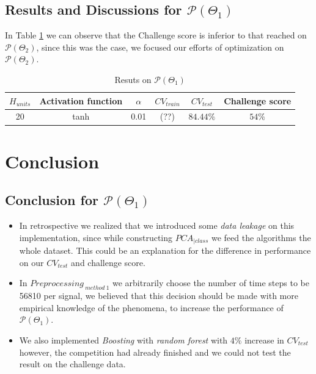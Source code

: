 \subsection{Results and Discussions for  $\mathcal{P}(\Theta_{1})$}

In Table \ref{table:p1_result} we can observe that the Challenge score is inferior to that reached on $\mathcal{P}(\Theta_{2})$, since this was the case, we focused our efforts of optimization on $\mathcal{P}(\Theta_{2})$.

\begin{table}[h!]
	\begin{center}
		\begin{tabular}{||c c c c c c||} 
			\hline
			$H_{units}$ &Activation function & $\alpha$ & $CV_{train}$ & $CV_{test}$  & Challenge score \\ [0.5ex] 
			\hline
			20 & tanh &0.01& (??) & $84.44\%$& $54\%$  \\ 
			\hline
		\end{tabular}
		\caption{Resuts on $\mathcal{P}(\Theta_{1})$}
		\label{table:p1_result}
	\end{center}
\end{table}



\section{Conclusion}

\subsection{Conclusion for $\mathcal{P}(\Theta_{1})$}

\begin{itemize}
	\item In retrospective we realized that we introduced some \emph{data leakage} on this implementation, since while constructing $PCA_{|class}$ we feed the algorithms the whole dataset. This could be an explanation for the difference in performance on our $CV_{test}$ and challenge score.
	\item In $Preprocessing_{ \ method \ 1}$  we arbitrarily choose the number of time steps to be 56810 per signal, we believed that this decision should be made with more empirical knowledge of the phenomena, to increase the performance of $\mathcal{P}(\Theta_{1})$.
	\item We also implemented \emph{Boosting} with \emph{random forest} with $4\%$ increase in $CV_{test}$ however, the competition had already finished and we could not test the result on the challenge data. 
\end{itemize}

